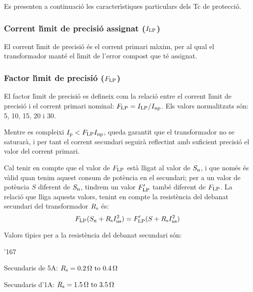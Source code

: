 Es presenten a continuaci\'{o} les caracter\'{\i}stiques particulars dels Tc
de protecci\'{o}.

\subsubsection{Corrent l\'{\i}mit de precisi\'{o} assignat ($I_\mathrm{LP}$)}

El corrent
l\'{\i}mit de precisi\'{o} \'{e}s el corrent primari m\`{a}xim, per al qual el transformador mant\'{e} el l\'{\i}mit
de l'error compost que t\'{e} assignat.

\subsubsection{Factor l\'{\i}mit de precisi\'{o} ($F_\mathrm{LP}$) }

 El factor l\'{\i}mit de precisi\'{o}
es defineix com la relaci\'{o} entre el corrent l\'{\i}mit de precisi\'{o}
i el corrent primari nominal: $F_\mathrm{LP} = I_\mathrm{LP} /I_\mathrm{np}$.
Els valors normalitzats s\'{o}n: 5, 10, 15, 20 i 30.

Mentre es compleixi  $I_\mathrm{p}<F_\mathrm{LP} I_\mathrm{np}$, queda garantit
que el transformador no se saturar\`{a}, i per tant el corrent
secundari seguir\`{a} reflectint amb suficient precisi\'{o} el valor del
corrent primari.

Cal tenir en compte que el valor de $F_\mathrm{LP}$ est\`{a} lligat
 al valor de $S_\mathrm{n}$, i que nom\'{e}s \'{e}s v\`{a}lid
quan tenim aquest consum de  pot\`{e}ncia en el secundari; per a un
valor de pot\`{e}ncia $S$ diferent de $S_\mathrm{n}$, tindrem un valor
$F'_\mathrm{LP}$ tamb\'{e} diferent de  $F_\mathrm{LP}$. La relaci\'{o} que
lliga aquests valors, tenint en compte la resist\`{e}ncia del debanat
secundari del transformador  $R_\mathrm{s}$ \'{e}s:
\begin{equation}\label{eq:flp}
    F_\mathrm{LP} (S_\mathrm{n}+R_\mathrm{s}I_\mathrm{ns}^2) =
    F'_\mathrm{LP} (S+R_\mathrm{s}I_\mathrm{ns}^2)
\end{equation}

Valors t\'{\i}pics per a la resist\`{e}ncia del debanat secundari s\'{o}n:
\begin{dinglist}{'167}
    \item Secundaris de 5\unit{A}: $R\ped{s} = \SIrange{0,2}{0,4}{\ohm}$
    \item Secundaris d'1\unit{A}:  $R\ped{s} = \SIrange{1,5}{3,5}{\ohm}$
\end{dinglist}

